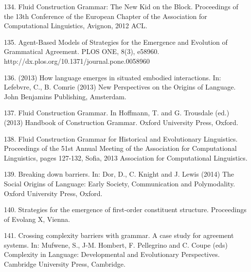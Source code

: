 134. \citet{Vantrijp:12q} Fluid Construction Grammar: The New Kid on the Block. Proceedings of the 13th Conference of the European Chapter of the Association for Computational Linguistics, Avignon, 2012 ACL.

135. \citet{Beuls:13a} Agent-Based Models of Strategies for the Emergence and Evolution of Grammatical Agreement. PLOS ONE, 8(3), e58960. http://dx.plos.org/10.1371/journal.pone.0058960

136. \citet{Steels:13b} (2013) How language emerges in situated embodied interactions. In: Lefebvre, C., B. Comrie (2013) New Perspectives on the Origins of Language. John Benjamins Publishing, Amsterdam. 

137. \citet{Steels:13c} Fluid Construction Grammar. In Hoffmann, T. and G. Trousdale (ed.) (2013) Handbook of Construction Grammar. Oxford University Press, Oxford. 

138. \citet{wellens:13d} Fluid Construction Grammar for Historical and Evolutionary Linguistics. Proceedings of the 51st Annual Meeting of the Association for Computational Linguistics, pages 127-132, Sofia, 2013 Association for Computational Linguistics.

139. \citet{Steels:14a} Breaking down barriers. In: Dor, D., C. Knight and J. Lewis (2014) The Social Origins of Language: Early Society, Communication and Polymodality. Oxford University Press, Oxford. 

140. \citet{Garcia:14b} Strategies for the emergence of first-order constituent structure. Proceedings of 
Evolang X, Vienna. 

141. \citet{Steels:14c} Crossing complexity barriers with grammar. A case study for agreement systems. In: Mufwene, S., J-M. Hombert, F. Pellegrino and C. Coupe (eds) Complexity in Language: Developmental and Evolutionary Perspectives. Cambridge University Press, Cambridge. 
